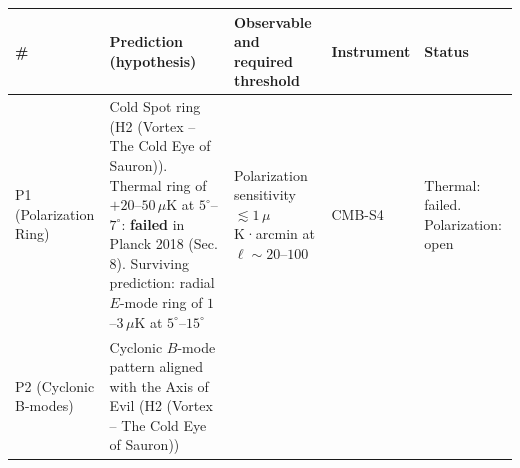 \documentclass[
  11pt,
]{article}
\begin{document}
\begin{longtable}[]{@{}lllll@{}}
\toprule
\begin{minipage}[b]{0.11\columnwidth}\raggedright
\#\strut
\end{minipage} & \begin{minipage}[b]{0.19\columnwidth}\raggedright
Prediction (hypothesis)\strut
\end{minipage} & \begin{minipage}[b]{0.19\columnwidth}\raggedright
Observable and required threshold\strut
\end{minipage} & \begin{minipage}[b]{0.19\columnwidth}\raggedright
Instrument\strut
\end{minipage} & \begin{minipage}[b]{0.19\columnwidth}\raggedright
Status\strut
\end{minipage}\tabularnewline
\midrule
\endhead
\begin{minipage}[t]{0.11\columnwidth}\raggedright
P1 (Polarization Ring)\strut
\end{minipage} & \begin{minipage}[t]{0.19\columnwidth}\raggedright
Cold Spot ring (H2 (Vortex -- The Cold Eye of Sauron)). Thermal ring of
\(+20\)--\(50\,\mu\)K at \(5^\circ\)--\(7^\circ\): \textbf{failed} in
Planck 2018 (Sec. 8). Surviving prediction: radial \(E\)-mode ring of
\(1\)--\(3\,\mu\)K at \(5^\circ\)--\(15^\circ\)\strut
\end{minipage} & \begin{minipage}[t]{0.19\columnwidth}\raggedright
Polarization sensitivity \(\lesssim 1\,\mu\)K·arcmin at
\(\ell \sim 20\)--\(100\)\strut
\end{minipage} & \begin{minipage}[t]{0.19\columnwidth}\raggedright
CMB-S4\strut
\end{minipage} & \begin{minipage}[t]{0.19\columnwidth}\raggedright
Thermal: failed. Polarization: open\strut
\end{minipage}\tabularnewline
\begin{minipage}[t]{0.11\columnwidth}\raggedright
P2 (Cyclonic B-modes)\strut
\end{minipage} & \begin{minipage}[t]{0.19\columnwidth}\raggedright
Cyclonic \(B\)-mode pattern aligned with the Axis of Evil (H2 (Vortex --
The Cold Eye of Sauron))\strut
\end{minipage} & \begin{minipage}[t]{0.19\columnwidth}\raggedright

\end{minipage}
\end{longtable}
\end{document}
